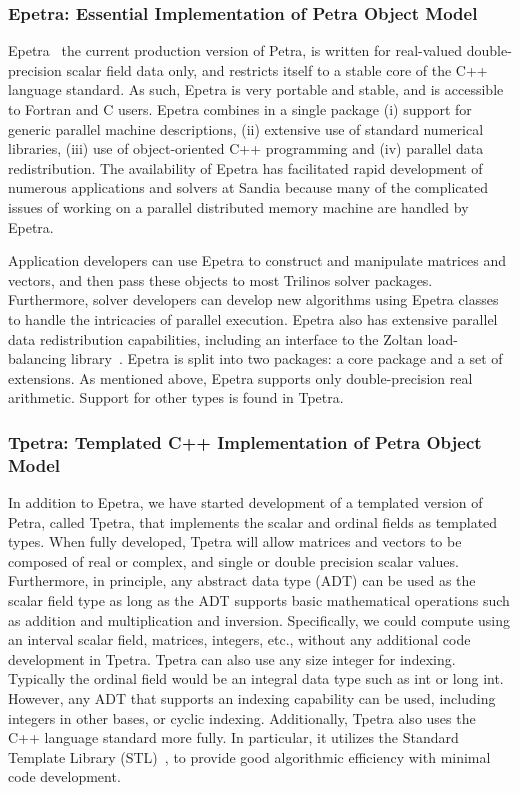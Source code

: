 \documentclass[acmtoms,acmnow]{acmtrans2m}
\begin{document}
\subsubsection{Epetra: Essential Implementation of Petra Object Model}

Epetra~\cite{Epetra-Ref-Guide} the current production version of Petra,
 is written for real-valued double-precision scalar field data only, and
restricts itself to a stable core
of the C++ language standard.  As such, Epetra is very portable and 
stable, and  
is accessible to Fortran and C users.  
Epetra combines in a single package (i) support 
for generic parallel
machine descriptions, (ii) extensive use of standard numerical 
libraries, (iii) use of object-oriented C++ programming and (iv) parallel data 
redistribution.  The availability of Epetra has 
facilitated rapid development
of numerous applications and solvers at Sandia because many of the 
complicated issues of
working on a parallel distributed memory machine are handled by Epetra.

Application developers can use Epetra to construct and manipulate matrices
and vectors, and then pass these objects to most Trilinos solver packages.
Furthermore, solver developers can develop new algorithms using 
Epetra classes to handle the intricacies of parallel execution.  
Epetra also has extensive parallel data  redistribution capabilities, 
including an interface to the Zoltan load-balancing
library~\cite{zoltan-ug}.  Epetra is split into two packages:  a core
package and a set of extensions.  As mentioned above, Epetra supports
only double-precision real arithmetic.  Support for other types is
found in Tpetra.

\subsubsection{Tpetra: Templated C++ Implementation of Petra Object Model}

In addition to Epetra, we have started development of a templated 
version of Petra, called Tpetra, that implements the scalar and 
ordinal fields as templated types.  When fully developed, Tpetra 
will allow matrices and vectors to be composed of real or complex, 
and single or double precision scalar values.  Furthermore, in 
principle, any abstract data type (ADT) can be used as the scalar 
field type as long as the ADT supports basic mathematical operations 
such as addition and multiplication and inversion. Specifically, we 
could compute using an interval scalar field, matrices, integers, etc., 
without any additional code development in Tpetra.  Tpetra can also 
use any size integer for indexing.  Typically the ordinal field would 
be an integral data type such as int or long int.  However, any ADT 
that supports an indexing capability can be used, including integers in 
other bases, or cyclic indexing. Additionally, Tpetra also uses the 
C++ language standard more fully.  In particular, it utilizes the 
Standard Template Library (STL)~\cite{Stroustrup}, to provide good 
algorithmic efficiency with minimal code development.
\end{document}

